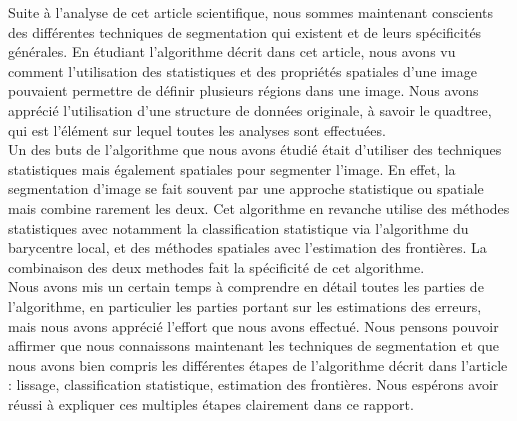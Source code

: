 Suite à l'analyse de cet article scientifique, nous sommes maintenant conscients des différentes techniques de segmentation qui existent et de leurs spécificités générales. En étudiant l'algorithme décrit dans cet article, nous avons vu comment l'utilisation des statistiques et des propriétés spatiales d'une image pouvaient permettre de définir plusieurs régions dans une image. Nous avons apprécié l'utilisation d'une structure de données originale, à savoir le quadtree, qui est l'élément sur lequel toutes les analyses sont effectuées.\\

Un des buts de l'algorithme que nous avons étudié était d'utiliser des techniques statistiques mais également spatiales pour segmenter l'image. En effet, la segmentation d'image se fait souvent par une approche statistique ou spatiale mais combine rarement les deux. Cet algorithme en revanche utilise des méthodes statistiques avec notamment la classification statistique via l'algorithme du barycentre local, et des méthodes spatiales avec l'estimation des frontières. La combinaison des deux methodes fait la spécificité de cet algorithme.\\

Nous avons mis un certain temps à comprendre en détail toutes les parties de l'algorithme, en particulier les parties portant sur les estimations des erreurs, mais nous avons apprécié l'effort que nous avons effectué. Nous pensons pouvoir affirmer que nous connaissons maintenant les techniques de segmentation et que nous avons bien compris les différentes étapes de l'algorithme décrit dans l'article : lissage, classification statistique, estimation des frontières. Nous espérons avoir réussi à expliquer ces multiples étapes clairement dans ce rapport.